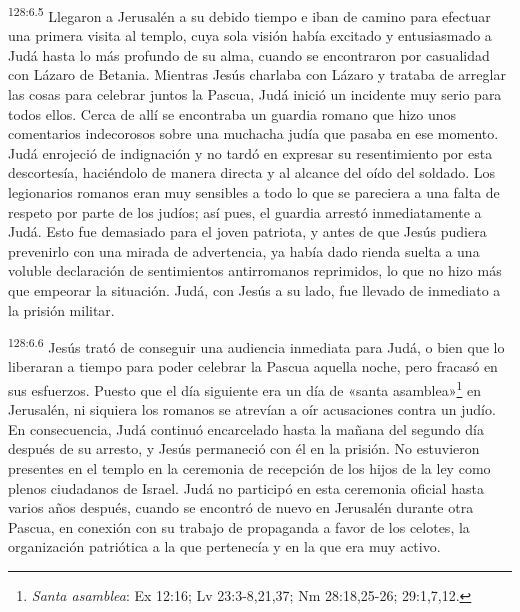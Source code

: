 \par
\textsuperscript{128:6.5} Llegaron a Jerusalén a su debido tiempo e iban de camino para efectuar una primera visita al templo, cuya sola visión había excitado y entusiasmado a Judá hasta lo más profundo de su alma, cuando se encontraron por casualidad con Lázaro de Betania. Mientras Jesús charlaba con Lázaro y trataba de arreglar las cosas para celebrar juntos la Pascua, Judá inició un incidente muy serio para todos ellos. Cerca de allí se encontraba un guardia romano que hizo unos comentarios indecorosos sobre una muchacha judía que pasaba en ese momento. Judá enrojeció de indignación y no tardó en expresar su resentimiento por esta descortesía, haciéndolo de manera directa y al alcance del oído del soldado. Los legionarios romanos eran muy sensibles a todo lo que se pareciera a una falta de respeto por parte de los judíos; así pues, el guardia arrestó inmediatamente a Judá. Esto fue demasiado para el joven patriota, y antes de que Jesús pudiera prevenirlo con una mirada de advertencia, ya había dado rienda suelta a una voluble declaración de sentimientos antirromanos reprimidos, lo que no hizo más que empeorar la situación. Judá, con Jesús a su lado, fue llevado de inmediato a la prisión militar.

\par
\textsuperscript{128:6.6} Jesús trató de conseguir una audiencia inmediata para Judá, o bien que lo liberaran a tiempo para poder celebrar la Pascua aquella noche, pero fracasó en sus esfuerzos. Puesto que el día siguiente era un día de «santa asamblea»\footnote{\textit{Santa asamblea}: Ex 12:16; Lv 23:3-8,21,37; Nm 28:18,25-26; 29:1,7,12.} en Jerusalén, ni siquiera los romanos se atrevían a oír acusaciones contra un judío. En consecuencia, Judá continuó encarcelado hasta la mañana del segundo día después de su arresto, y Jesús permaneció con él en la prisión. No estuvieron presentes en el templo en la ceremonia de recepción de los hijos de la ley como plenos ciudadanos de Israel. Judá no participó en esta ceremonia oficial hasta varios años después, cuando se encontró de nuevo en Jerusalén durante otra Pascua, en conexión con su trabajo de propaganda a favor de los celotes, la organización patriótica a la que pertenecía y en la que era muy activo.

